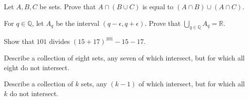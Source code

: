 \documentclass[12pt]{midterm}
\begin{document}
\begin{exam}
\begin{solution}\begin{solutiontext}
\end{solutiontext}\end{solution}

\begin{problem}[350]
Let $A,B,C$ be sets.  Prove that $A \cap (B \cup C)$ is equal to $(A
\cap B) \cup (A \cap C)$.
\end{problem}

\begin{solution}\begin{solutiontext}
\end{solutiontext}\end{solution}

\begin{problem}[350]
  For $q \in \mathbb{Q}$, let $A_q$ be the interval $(q - \epsilon, q+
  \epsilon)$.  Prove that $\bigcup_{q \in \mathbb{Q}} A_q = \mathbb{R}$.
\end{problem}

\begin{solution}\begin{solutiontext}
\end{solutiontext}\end{solution}

\begin{problem}[350]
Show that $101$ divides $(15 + 17)^{101} - 15 - 17$.
\end{problem}

\begin{solution}\begin{solutiontext}
\end{solutiontext}\end{solution}

\begin{problem}[350]
  Describe a collection of eight sets, any seven of which intersect,
  but for which all eight do not intersect.

  Describe a collection of $k$ sets, any $(k-1)$ of which intersect,
  but for which all $k$ do not intersect.
\end{problem}


\end{exam}
\end{document}
